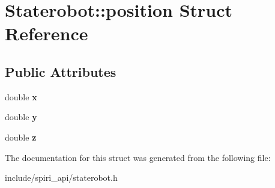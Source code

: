 \hypertarget{struct_staterobot_1_1position}{\section{\-Staterobot\-:\-:position \-Struct \-Reference}
\label{struct_staterobot_1_1position}
}
\subsection*{\-Public \-Attributes}
\begin{DoxyCompactItemize}
\item 
\hypertarget{struct_staterobot_1_1position_a4a8f61458e430a655af909a9ca9c8032}{double {\bfseries x}}\label{struct_staterobot_1_1position_a4a8f61458e430a655af909a9ca9c8032}

\item 
\hypertarget{struct_staterobot_1_1position_afee393ab6a22b45c49bb827e808602c8}{double {\bfseries y}}\label{struct_staterobot_1_1position_afee393ab6a22b45c49bb827e808602c8}

\item 
\hypertarget{struct_staterobot_1_1position_af2d6d67ad8fd83d68b7903a49133c62f}{double {\bfseries z}}\label{struct_staterobot_1_1position_af2d6d67ad8fd83d68b7903a49133c62f}

\end{DoxyCompactItemize}


\-The documentation for this struct was generated from the following file\-:\begin{DoxyCompactItemize}
\item 
include/spiri\-\_\-api/staterobot.\-h\end{DoxyCompactItemize}
